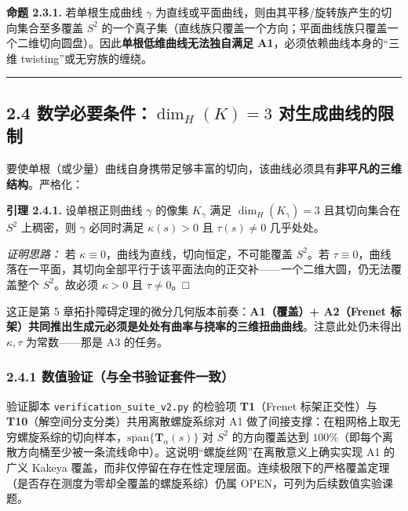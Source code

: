 \textbf{命题 2.3.1.} 若单根生成曲线 \(\gamma\)
为直线或平面曲线，则由其平移/旋转族产生的切向集合至多覆盖 \(S^2\)
的一个真子集（直线族只覆盖一个方向；平面曲线族只覆盖一个二维切向圆盘）。因此\textbf{单根低维曲线无法独自满足
A1}，必须依赖曲线本身的``三维 twisting''或无穷族的缠绕。

\begin{center}\rule{0.5\linewidth}{0.5pt}\end{center}

\subsection{\texorpdfstring{2.4 数学必要条件：\(\dim_H(K)=3\)
对生成曲线的限制}{2.4 数学必要条件：\textbackslash dim\_H(K)=3 对生成曲线的限制}}\label{ux6570ux5b66ux5fc5ux8981ux6761ux4ef6dim_hk3-ux5bf9ux751fux6210ux66f2ux7ebfux7684ux9650ux5236}

要使单根（或少量）曲线自身携带足够丰富的切向，该曲线必须具有\textbf{非平凡的三维结构}。严格化：

\textbf{引理 2.4.1.} 设单根正则曲线 \(\gamma\) 的像集 \(K_\gamma\) 满足
\(\dim_H(K_\gamma)=3\) 且其切向集合在 \(S^2\) 上稠密，则 \(\gamma\)
必同时满足 \(\kappa(s)>0\) 且 \(\tau(s)\neq 0\) 几乎处处。

\emph{证明思路：} 若 \(\kappa\equiv0\)，曲线为直线，切向恒定，不可能覆盖
\(S^2\)。若
\(\tau\equiv0\)，曲线落在一平面，其切向全部平行于该平面法向的正交补------一个二维大圆，仍无法覆盖整个
\(S^2\)。故必须 \(\kappa>0\) 且 \(\tau\neq0\)。□

这正是第 5 章拓扑障碍定理的微分几何版本前奏：\textbf{A1（覆盖）+
A2（Frenet
标架）共同推出生成元必须是处处有曲率与挠率的三维扭曲曲线}。注意此处仍未得出
\(\kappa,\tau\) 为常数------那是 A3 的任务。

\subsubsection{2.4.1
数值验证（与全书验证套件一致）}\label{ux6570ux503cux9a8cux8bc1ux4e0eux5168ux4e66ux9a8cux8bc1ux5957ux4ef6ux4e00ux81f4}

验证脚本 \texttt{verification\_suite\_v2.py} 的检验项
\textbf{T1}（Frenet 标架正交性）与
\textbf{T10}（解空间分支分类）共用离散螺旋系综对 A1
做了间接支撑：在粗网格上取无穷螺旋系综的切向样本，\(\mathrm{span}\{\mathbf{T}_\alpha(s)\}\)
对 \(S^2\) 的方向覆盖达到
\(100\%\)（即每个离散方向桶至少被一条流线命中）。这说明``螺旋丝网''在离散意义上确实实现
A1 的广义 Kakeya
覆盖，而非仅停留在存在性定理层面。连续极限下的严格覆盖定理（是否存在测度为零却全覆盖的螺旋系综）仍属
OPEN，可列为后续数值实验课题。

